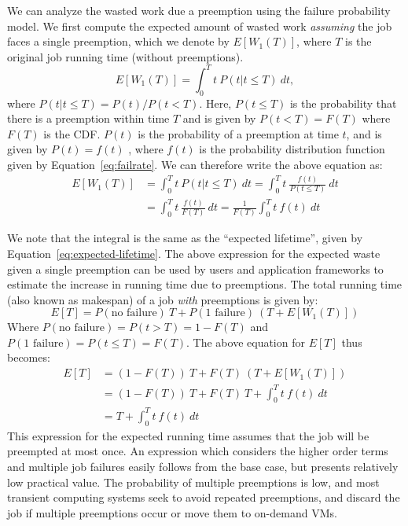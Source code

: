 We can analyze the wasted work due a preemption using the failure probability model.
We first compute the expected amount of wasted work \emph{assuming} the job faces a single preemption, which we denote by $E[W_1(T)]$, where $T$ is the original job running time (without preemptions).
\begin{equation}
E[W_1(T)] = \int_0^{T} t~P(t | t \leq T)~dt , 
\end{equation}
where $P(t|t\leq T) = P(t) / P(t<T)$. Here, $P(t\leq T)$ is the probability that there is a preemption within time $T$ and is given by $P(t<T) = F(T)$ where $F(T)$ is the CDF. 
$P(t)$ is the probability of a preemption at time $t$, and is given by $P(t) = f(t)$ , where $f(t)$ is the probability distribution function given by Equation~\ref{eq:failrate}.
We can therefore write the above equation as:
\begin{align}
  E[W_1(T)] &= \int_0^{T} t~P(t | t \leq T)~dt \nonumber 
  = \int_0^{T} t~\frac{f(t)}{P(t \leq T)}~dt \\ 
  &= \int_0^{T} t~\frac{f(t)}{F(T)}~dt 
    = \frac{1}{F(T)}  \int_0^{T} t~f(t)~dt
    \label{eq:wasted}
\end{align}

We note that the integral is the same as the ``expected lifetime'', given by Equation~\ref{eq:expected-lifetime}.
%
The above expression for the expected waste given a single preemption can be used by users and application frameworks to estimate the increase in running time due to preemptions. %
The total running time (also known as makespan) of a job \emph{with} preemptions is given by:
\begin{equation}
  \label{eq:tot-run-time}
  E[T] = P(\text{no failure})~T + P(\text{1 failure})~(T + E[W_1(T)])
\end{equation}
Where $P(\text{no failure}) = P(t > T) =  1- F(T)$ and $P(\text{1 failure}) = P(t \leq T) = F(T)$.
The above equation for $E[T]$ thus becomes: 
%
\begin{align}
  \label{eq:tot-run-time-2}
  E[T] &= (1-F(T))~T + F(T)~(T + E[W_1(T)]) \\ \nonumber
  &= (1-F(T))~T + F(T)~T + \int_0^{T} t~f(t)~dt \\ \nonumber
       &= T + \int_0^{T} t~f(t)~dt         
\end{align}
This expression for the expected running time assumes that the job will be preempted at most once.
An expression which considers the higher order terms and multiple job failures easily follows from the base case, but presents relatively low practical value. 
The probability of multiple preemptions is low, and most transient computing systems seek to avoid repeated preemptions, and discard the job if multiple preemptions occur or move them to on-demand VMs. 

